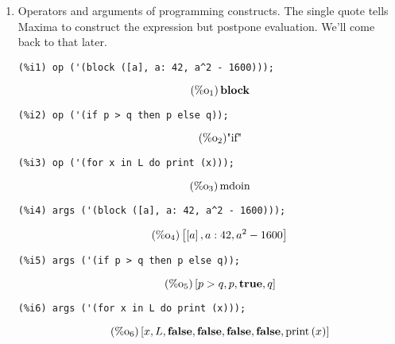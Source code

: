 \documentclass[12pt,leqno]{article}
\begin{document}
\begin{enumerate}
\item Operators and arguments of programming constructs.
The single quote tells Maxima to construct the expression but postpone evaluation.
We'll come back to that later.
\begin{verbatim}
(%i1) op ('(block ([a], a: 42, a^2 - 1600)));
\end{verbatim}
\begin{equation}
\tag{$\mathop{\mathrm{\%o}_{1}}$}\mathop{\mathbf{block}}
\label{eq:doc-group1-code11-1-1}
\end{equation}
\begin{verbatim}
(%i2) op ('(if p > q then p else q));
\end{verbatim}
\begin{equation}
\tag{$\mathop{\mathrm{\%o}_{2}}$}\mbox{"if"}
\label{eq:doc-group1-code11-2-1}
\end{equation}
\begin{verbatim}
(%i3) op ('(for x in L do print (x)));
\end{verbatim}
\begin{equation}
\tag{$\mathop{\mathrm{\%o}_{3}}$}\mathop{\mathrm{mdoin}}
\label{eq:doc-group1-code11-3-1}
\end{equation}
\begin{verbatim}
(%i4) args ('(block ([a], a: 42, a^2 - 1600)));
\end{verbatim}
\begin{equation}
\tag{$\mathop{\mathrm{\%o}_{4}}$}\left[\left[a\right], a : 42, {a}^{2}-1600\right]
\label{eq:doc-group1-code11-4-1}
\end{equation}
\begin{verbatim}
(%i5) args ('(if p > q then p else q));
\end{verbatim}
\begin{equation}
\tag{$\mathop{\mathrm{\%o}_{5}}$}\left[p > q, p, \mathop{\mathbf{true}}, q\right]
\label{eq:doc-group1-code11-5-1}
\end{equation}
\begin{verbatim}
(%i6) args ('(for x in L do print (x)));
\end{verbatim}
\begin{equation}
\tag{$\mathop{\mathrm{\%o}_{6}}$}\left[x, L, \mathop{\mathbf{false}}, \mathop{\mathbf{false}}, \mathop{\mathbf{false}}, \mathop{\mathbf{false}}, \mathop{\mathrm{print}}\left(x\right)\right]
\label{eq:doc-group1-code11-6-1}
\end{equation}


\end{enumerate}
\end{document}
